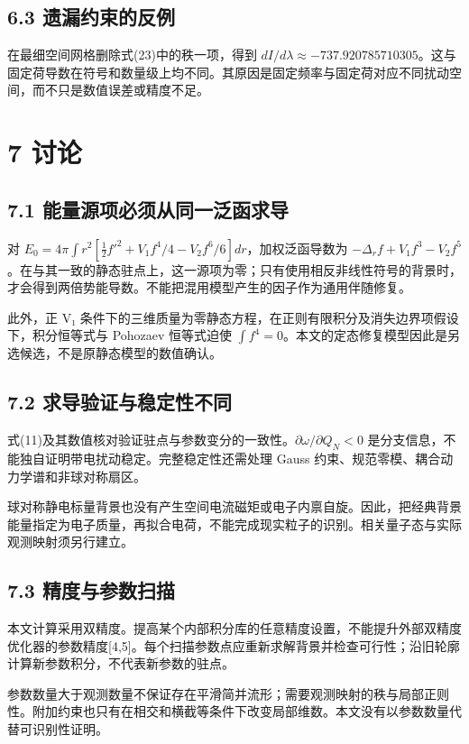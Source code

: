 \documentclass[UTF8,fontset=fandol,11pt]{ctexart}
\begin{document}
\subsection*{6.3 遗漏约束的反例}

在最细空间网格删除式(23)中的秩一项，得到 \(dI/d\lambda\approx-737.920785710305\)。这与固定荷导数在符号和数量级上均不同。其原因是固定频率与固定荷对应不同扰动空间，而不只是数值误差或精度不足。

\section*{7 讨论}

\subsection*{7.1 能量源项必须从同一泛函求导}

对 \(E_0=4\pi\int r^2[\tfrac12f'^2+V_1f^4/4-V_2f^6/6]dr\)，加权泛函导数为 \(-\Delta_rf+V_1f^3-V_2f^5\)。在与其一致的静态驻点上，这一源项为零；只有使用相反非线性符号的背景时，才会得到两倍势能导数。不能把混用模型产生的因子作为通用伴随修复。

此外，正 V₁ 条件下的三维质量为零静态方程，在正则有限积分及消失边界项假设下，积分恒等式与 Pohozaev 恒等式迫使 \(\int f^4=0\)。本文的定态修复模型因此是另选候选，不是原静态模型的数值确认。

\subsection*{7.2 求导验证与稳定性不同}

式(11)及其数值核对验证驻点与参数变分的一致性。\(\partial\omega/\partial Q_N<0\) 是分支信息，不能独自证明带电扰动稳定。完整稳定性还需处理 Gauss 约束、规范零模、耦合动力学谱和非球对称扇区。

球对称静电标量背景也没有产生空间电流磁矩或电子内禀自旋。因此，把经典背景能量指定为电子质量，再拟合电荷，不能完成现实粒子的识别。相关量子态与实际观测映射须另行建立。

\subsection*{7.3 精度与参数扫描}

本文计算采用双精度。提高某个内部积分库的任意精度设置，不能提升外部双精度优化器的参数精度[4,5]。每个扫描参数点应重新求解背景并检查可行性；沿旧轮廓计算新参数积分，不代表新参数的驻点。

参数数量大于观测数量不保证存在平滑简并流形；需要观测映射的秩与局部正则性。附加约束也只有在相交和横截等条件下改变局部维数。本文没有以参数数量代替可识别性证明。
\end{document}
